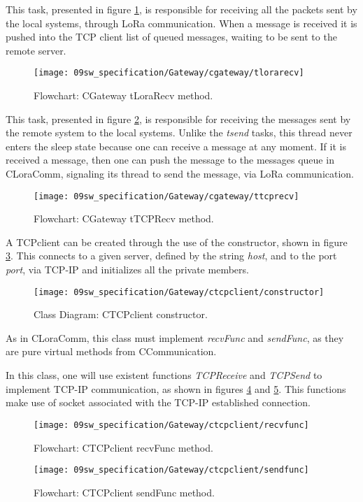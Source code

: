 \clearpage
This task, presented in figure \ref{fig:gwtLoraRecv}, is responsible for receiving all the packets sent by the local systems, through LoRa communication. When a message is received it is pushed into the TCP client list of queued messages, waiting to be sent to the remote server.

\begin{figure}[H]
	\centering
	\texttt{[image: 09sw\_specification/Gateway/cgateway/tlorarecv]}
	\caption{Flowchart: CGateway tLoraRecv method.}
	\label{fig:gwtLoraRecv}
\end{figure}

\clearpage
This task, presented in figure \ref{fig:gwtTCPRecv}, is responsible for receiving the messages sent by the remote system to the local systems. Unlike the \textit{tsend} tasks, this thread never enters the sleep state because one can receive a message at any moment. If it is received a message, then one can push the message to the messages queue in CLoraComm, signaling its thread to send the message, via LoRa communication.

\begin{figure}[H]
	\centering
	\texttt{[image: 09sw\_specification/Gateway/cgateway/ttcprecv]}
	\caption{Flowchart: CGateway tTCPRecv method.}
	\label{fig:gwtTCPRecv}
\end{figure}

\clearpage
{}

A TCPclient can be created through the use of the constructor, shown in figure \ref{fig:TCPclientconstructor}. This connects to a given server, defined by the string \textit{host}, and to the port \textit{port}, via TCP-IP and initializes all the private members.

\begin{figure}[H]
	\centering
	\texttt{[image: 09sw\_specification/Gateway/ctcpclient/constructor]}
	\caption{Class Diagram: CTCPclient constructor.}
	\label{fig:TCPclientconstructor}
\end{figure}

As in CLoraComm, this class must implement \textit{recvFunc} and \textit{sendFunc}, as they are pure virtual methods from CCommunication. 

In this class, one will use existent functions \textit{TCPReceive} and \textit{TCPSend} to implement TCP-IP communication, as shown in figures \ref{fig:TCPclientrecvfunc} and \ref{fig:TCPclientsendfunc}. This functions make use of socket associated with the TCP-IP established connection.

\begin{figure}[H]
	\centering
	\texttt{[image: 09sw\_specification/Gateway/ctcpclient/recvfunc]}
	\caption{Flowchart: CTCPclient recvFunc method.}
	\label{fig:TCPclientrecvfunc}
\end{figure}

\begin{figure}[H]
	\centering
	\texttt{[image: 09sw\_specification/Gateway/ctcpclient/sendfunc]}
	\caption{Flowchart: CTCPclient sendFunc method.}
	\label{fig:TCPclientsendfunc}
\end{figure}